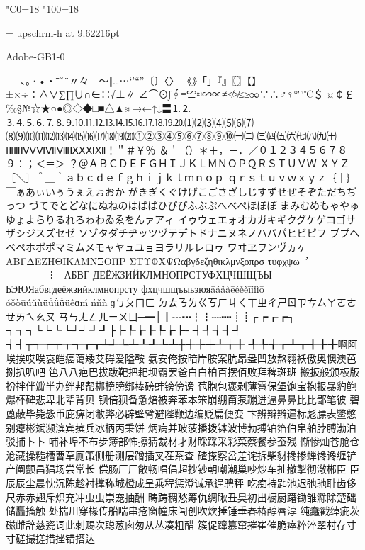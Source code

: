%
%
%
%
\kcatcode"C0=18%
\kcatcode"100=18%

\font\upschrm = upschrm-h at 9.62216pt
\upschrm


Adobe-GB1-0

 　、。·•・ˉˇ¨〃々—～‖…⋯‘’“”〔〕〈〉
《》「」『』〖〗【】±×÷∶∧∨∑∏∪∩∈∷√⊥∥
∠⌒⊙∫∮≡≌≈∽∝≠≮≯≤≥∞∵∴♂♀°′″℃＄
¤￠￡‰§№☆★○●◎◇◆□■△▲※→←↑↓〓⒈⒉
⒊⒋⒌⒍⒎⒏⒐⒑⒒⒓⒔⒕⒖⒗⒘⒙⒚⒛⑴⑵⑶⑷⑸⑹⑺
⑻⑼⑽⑾⑿⒀⒁⒂⒃⒄⒅⒆⒇①②③④⑤⑥⑦⑧⑨⑩㈠㈡
㈢㈣㈤㈥㈦㈧㈨㈩ⅠⅡⅢⅣⅤⅥⅦⅧⅨⅩⅪⅫ！＂＃￥％
＆＇（）＊＋，－．／０１２３４５６７８９：；＜＝＞
？＠ＡＢＣＤＥＦＧＨＩＪＫＬＭＮＯＰＱＲＳＴＵＶＷ
ＸＹＺ［＼］＾＿｀ａｂｃｄｅｆｇｈｉｊｋｌｍｎｏｐ
ｑｒｓｔｕｖｗｘｙｚ｛｜｝￣ぁあぃいぅうぇえぉおか
がきぎくぐけげこごさざしじすずせぜそぞただちぢっつ
づてでとどなにぬねのはばぱひびぴふぶぷへべぺほぼぽ
まみむめもゃやゅゆょよらりるれろゎわゐゑをんァアィ
イゥウェエォオカガキギクグケゲコゴサザシジスズセゼ
ソゾタダチヂッツヅテデトドナニヌネノハバパヒビピフ
ブプヘベペホボポマミムメモャヤュユョヨラリルレロヮ
ワヰヱヲンヴヵヶΑΒΓΔΕΖΗΘΙΚΛΜΝΞΟΠΡ
ΣΤΥΦΧΨΩαβγδεζηθικλμνξοπρσ
τυφχψω︐︒︑︓︔︕︖︵︶︹︺︿
﹀︽︾﹁﹂﹃﹄︗︘︻︼︷︸︱⁝︙︳︴АБВГ
ДЕЁЖЗИЙКЛМНОПРСТУФХЦЧШЩЪЫ
ЬЭЮЯабвгдеёжзийклмнопрсту
фхцчшщъыьэюяāáǎàēéěèīíǐìō
óǒòūúǔùǖǘǚǜüêɑḿńňǹɡㄅㄆㄇㄈ
ㄉㄊㄋㄌㄍㄎㄏㄐㄑㄒㄓㄔㄕㄖㄗㄘㄙㄚㄛㄜㄝㄞㄟㄠㄡ
ㄢㄣㄤㄥㄦㄧㄨㄩ─━│┃┄┅┆┇┈┉┊┋┌┍┎┏┐
┑┒┓└┕┖┗┘┙┚┛├┝┞┟┠┡┢┣┤┥┦┧┨┩
┪┫┬┭┮┯┰┱┲┳┴┵┶┷┸┹┺┻┼┽┾┿╀╁╂
╃╄╅╆╇╈╉╊╋啊阿埃挨哎唉哀皑癌蔼矮艾碍爱隘鞍
氨安俺按暗岸胺案肮昂盎凹敖熬翱袄傲奥懊澳芭捌扒叭吧
笆⼋八疤巴拔跋靶把耙坝霸罢爸⽩白柏百摆佰败拜稗斑班
搬扳般颁板版扮拌伴瓣半办绊邦帮梆榜膀绑棒磅蚌镑傍谤
苞胞包褒剥薄雹保堡饱宝抱报暴豹鲍爆杯碑悲卑北辈背贝
钡倍狈备惫焙被奔苯本笨崩绷甭泵蹦迸逼⿐鼻⽐比鄙笔彼
碧蓖蔽毕毙毖币庇痹闭敝弊必辟壁臂避陛鞭边编贬扁便变
卞辨辩辫遍标彪膘表鳖憋别瘪彬斌濒滨宾摈兵冰柄丙秉饼
炳病并玻菠播拨钵波博勃搏铂箔伯帛舶脖膊渤泊驳捕⼘卜
哺补埠不布步簿部怖擦猜裁材才财睬踩采彩菜蔡餐参蚕残
惭惨灿苍舱仓沧藏操糙槽曹草厕策侧册测层蹭插叉茬茶查
碴搽察岔差诧拆柴豺搀掺蝉馋谗缠铲产阐颤昌猖场尝常长
偿肠⼚厂敞畅唱倡超抄钞朝嘲潮巢吵炒车扯撤掣彻澈郴⾂
臣⾠辰尘晨忱沉陈趁衬撑称城橙成呈乘程惩澄诚承逞骋秤
吃痴持匙池迟弛驰耻齿侈尺⾚赤翅斥炽充冲⾍虫崇宠抽酬
畴踌稠愁筹仇绸瞅丑臭初出橱厨躇锄雏滁除楚础储矗搐触
处揣川穿椽传船喘串疮窗幢床闯创吹炊捶锤垂春椿醇唇淳
纯蠢戳绰疵茨磁雌辞慈瓷词此刺赐次聪葱囱匆从丛凑粗醋
簇促蹿篡窜摧崔催脆瘁粹淬翠村存⼨寸磋撮搓措挫错搭达

